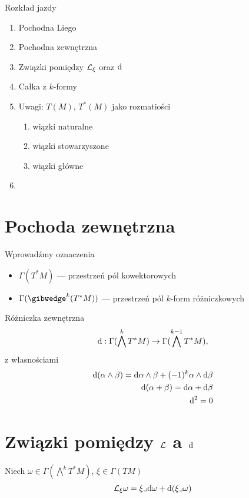 \documentclass[11pt]{book}
\theoremstyle{definition} %
\theoremstyle{plain} %
\theoremstyle{remark} %
\theoremstyle{underline}
\begin{document}
  Rozkład jazdy
  \begin{enumerate}
    \item Pochodna Liego
    \item Pochodna zewnętrzna
    \item Związki pomiędzy $\mathcal{L}_\xi$ oraz $\mathrm{d}$
    \item Całka z $k$-formy
    \item Uwagi: $T(M)$, $T^*(M)$ jako rozmatiości
      \begin{enumerate}
        \item wiązki naturalne
        \item wiązki stowarzyszone
        \item wiązki główne
      \end{enumerate}
    \item 
  \end{enumerate}

  
  \section{Pochoda zewnętrzna}

  Wprowadźmy oznaczenia 
  \begin{itemize}
    \item $\Gamma(T^*M)$ --- przestrzeń pól kowektorowych
    \item $\Gamma(\gibwedge^k(T^*M))$ --- przestrzeń pól $k$-form różniczkowych
  \end{itemize}
  Różniczka zewnętrzna
  \begin{displaymath}
    \mathrm{d} : \Gamma(\bigwedge^k T^*M) \rightarrow \Gamma(\bigwedge^{k - 1}T^*M),
  \end{displaymath}
  z własnościami
  \begin{align*}
    \mathrm{d} (\alpha \wedge \beta) = \mathrm{d} \alpha \wedge \beta + (-1)^k \alpha \wedge\mathrm{d} \beta \\
    \mathrm{d} (\alpha + \beta) = \mathrm{d} \alpha + \mathrm{d} \beta\\
    \mathrm{d}^2 = 0
  \end{align*}

  \section{Związki pomiędzy $\mathcal{L}$ a $\mathrm{d}$}
  Niech $\omega \in \Gamma(\bigwedge^k T^*M)$, $\xi \in \Gamma(TM)$
  \begin{displaymath}
    \mathcal{L}_\xi \omega = \xi \lrcorner \mathrm{d} \omega + \mathrm{d} (\xi \lrcorner \omega)
  \end{displaymath}
\end{document}
